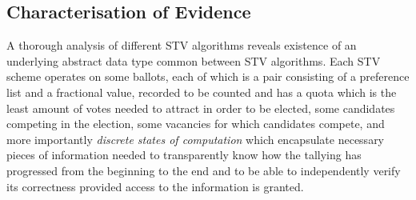 \documentclass[10pt,conference]{IEEEtran}
\begin{document}
\subsection{Characterisation of Evidence}
A thorough analysis of different STV algorithms reveals existence of an underlying abstract data type common between STV algorithms. Each STV scheme operates on some ballots, each of which is a pair consisting of a preference list and a fractional value, recorded to be counted and has a quota which is the least amount of votes needed to attract in order to be elected, some candidates competing in the election, some vacancies for which candidates compete, and more importantly \emph{discrete states of computation} which encapsulate necessary  pieces of information needed to transparently know how the tallying has progressed from the beginning to the end and to be able to independently verify its correctness provided access to the information is granted. 
\end{document}
